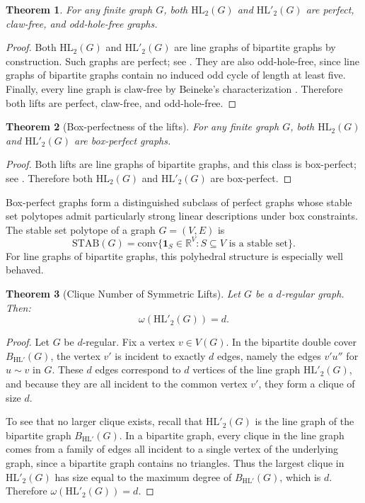 \documentclass[11pt]{article}
\newtheorem{theorem}{Theorem}
\newcommand{\HL}{\mathrm{HL}}
\theoremstyle{plain}
\begin{document}
\begin{theorem}\label{thm:lifts-perfect-clawfree}
For any finite graph \( G \), both \( \mathrm{HL}_2(G) \) and \( \mathrm{HL}'_2(G) \) are perfect,
claw-free, and odd-hole-free graphs.
\end{theorem}

\begin{proof}
Both \( \HL_2(G) \) and \( \HL'_2(G) \) are line graphs of bipartite graphs by construction.
Such graphs are perfect; see \cite{chudnovsky2006spgt,schrijver2003}. They are also odd-hole-free,
since line graphs of bipartite graphs contain no induced odd cycle of length at least five.
Finally, every line graph is claw-free by Beineke’s characterization \cite{beineke1970}.
Therefore both lifts are perfect, claw-free, and odd-hole-free.
\end{proof}

\begin{theorem}[Box-perfectness of the lifts]\label{thm:lifts-box-perfect}
For any finite graph \( G \), both \( \mathrm{HL}_2(G) \) and \( \mathrm{HL}'_2(G) \) are
box-perfect graphs.
\end{theorem}

\begin{proof}
Both lifts are line graphs of bipartite graphs, and this class is box-perfect; see \cite{schrijver2003}.
Therefore both \( \HL_2(G) \) and \( \HL'_2(G) \) are box-perfect.
\end{proof}

Box-perfect graphs form a distinguished subclass of perfect graphs whose stable set polytopes admit particularly strong linear
descriptions under box constraints. The stable set polytope of a graph \( G=(V,E) \) is
\[
\mathrm{STAB}(G)=\mathrm{conv}\bigl\{\mathbf{1}_S\in\mathbb{R}^V : S\subseteq V \text{ is a stable set}\bigr\}.
\]
For line graphs of bipartite graphs, this polyhedral structure is especially well behaved.


\begin{theorem}[Clique Number of Symmetric Lifts]\label{thm:clique-number}
Let \( G \) be a \( d \)-regular graph. Then:
\[
\omega(\mathrm{HL}'_2(G)) = d.
\]
\end{theorem}

\begin{proof}
Let \(G\) be \(d\)-regular. Fix a vertex \(v\in V(G)\). In the bipartite double cover \(B_{\HL'}(G)\),
the vertex \(v'\) is incident to exactly \(d\) edges, namely the edges \(v'u''\) for \(u\sim v\) in \(G\).
These \(d\) edges correspond to \(d\) vertices of the line graph \(\HL'_2(G)\), and because they are all
incident to the common vertex \(v'\), they form a clique of size \(d\).

To see that no larger clique exists, recall that \(\HL'_2(G)\) is the line graph of the bipartite graph
\(B_{\HL'}(G)\). In a bipartite graph, every clique in the line graph comes from a family of edges all
incident to a single vertex of the underlying graph, since a bipartite graph contains no triangles.
Thus the largest clique in \(\HL'_2(G)\) has size equal to the maximum degree of \(B_{\HL'}(G)\), which is
\(d\). Therefore \(\omega(\HL'_2(G))=d\).
\end{proof}
\end{document}
